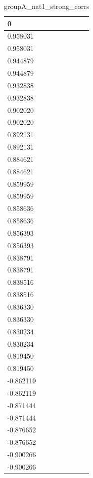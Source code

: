 \begin{table}
\caption{groupA_nat1_strong_corrs}
\label{tab:groupA_nat1_strong_corrs}
\begin{tabular}{lcr}
\toprule
0 \\
\midrule
0.958031 \\
0.958031 \\
0.944879 \\
0.944879 \\
0.932838 \\
0.932838 \\
0.902020 \\
0.902020 \\
0.892131 \\
0.892131 \\
0.884621 \\
0.884621 \\
0.859959 \\
0.859959 \\
0.858636 \\
0.858636 \\
0.856393 \\
0.856393 \\
0.838791 \\
0.838791 \\
0.838516 \\
0.838516 \\
0.836330 \\
0.836330 \\
0.830234 \\
0.830234 \\
0.819450 \\
0.819450 \\
-0.862119 \\
-0.862119 \\
-0.871444 \\
-0.871444 \\
-0.876652 \\
-0.876652 \\
-0.900266 \\
-0.900266 \\
\bottomrule
\end{tabular}
\end{table}
